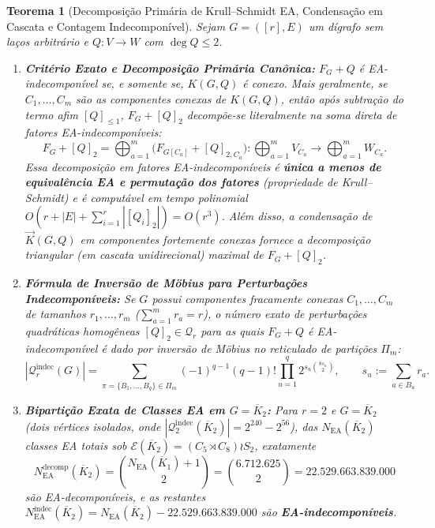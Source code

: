 \documentclass[11pt,a4paper]{article}
\newtheorem{theorem}{Teorema}[section]
\theoremstyle{definition}
\theoremstyle{remark}
\begin{document}
\begin{theorem}[Decomposição Primária de Krull--Schmidt EA, Condensação em Cascata e Contagem Indecomponível]\label{thm:c2_decomposition}
Sejam $G = ([r], E)$ um dígrafo sem laços arbitrário e $Q : V \to W$ com $\deg Q \le 2$.
\begin{enumerate}
  \item \textbf{Critério Exato e Decomposição Primária Canônica:} $F_G + Q$ é EA-indecomponível se, e somente se, $K(G,Q)$ é conexo. Mais geralmente, se $C_1,\dots,C_m$ são as componentes conexas de $K(G,Q)$, então após subtração do termo afim $[Q]_{\le 1}$, $F_G + [Q]_2$ decompõe-se literalmente na soma direta de fatores EA-indecomponíveis:
  \begin{equation}\label{eq:krull_schmidt}
    F_G + [Q]_2 = \bigoplus_{a=1}^m \Big( F_{G[C_a]} + [Q]_{2, C_a} \Big) : \bigoplus_{a=1}^m V_{C_a} \longrightarrow \bigoplus_{a=1}^m W_{C_a}.
  \end{equation}
  Essa decomposição em fatores EA-indecomponíveis é \textbf{única a menos de equivalência EA e permutação dos fatores} (propriedade de Krull--Schmidt) e é computável em tempo polinomial $O(r + |E| + \sum_{i=1}^r |[Q_i]_2|) = O(r^3)$. Além disso, a condensação de $\vec{K}(G,Q)$ em componentes fortemente conexas fornece a decomposição triangular (em cascata unidirecional) maximal de $F_G + [Q]_2$.
  \item \textbf{Fórmula de Inversão de Möbius para Perturbações Indecomponíveis:} Se $G$ possui componentes fracamente conexas $C_1,\dots,C_m$ de tamanhos $r_1,\dots,r_m$ ($\sum_{a=1}^m r_a = r$), o número exato de perturbações quadráticas homogêneas $[Q]_2 \in \mathcal{Q}_r$ para as quais $F_G + Q$ é EA-indecomponível é dado por inversão de Möbius no reticulado de partições $\Pi_m$:
  \begin{equation}\label{eq:mobius_indec_Q}
    |\mathcal{Q}_r^{\mathrm{indec}}(G)| = \sum_{\pi = \{B_1,\dots,B_q\} \in \Pi_m} (-1)^{q-1} (q-1)! \prod_{u=1}^q 2^{s_u \binom{8s_u}{2}}, \qquad s_u := \sum_{a \in B_u} r_a.
  \end{equation}
  \item \textbf{Bipartição Exata de Classes EA em $G = \overline{K}_2$:} Para $r=2$ e $G = \overline{K}_2$ (dois vértices isolados, onde $|\mathcal{Q}_2^{\mathrm{indec}}(\overline{K}_2)| = 2^{240} - 2^{56}$), das $N_{\mathrm{EA}}(\overline{K}_2)$ classes EA totais sob $\mathcal{E}(\overline{K}_2) = (C_5 \rtimes C_8) \wr S_2$, exatamente
  \[
    N_{\mathrm{EA}}^{\mathrm{decomp}}(\overline{K}_2) = \binom{N_{\mathrm{EA}}(\overline{K}_1) + 1}{2} = \binom{6.712.625}{2} = 22.529.663.839.000
  \]
  são EA-decomponíveis, e as restantes $N_{\mathrm{EA}}^{\mathrm{indec}}(\overline{K}_2) = N_{\mathrm{EA}}(\overline{K}_2) - 22.529.663.839.000$ são \textbf{EA-indecomponíveis}.
\end{enumerate}
\end{theorem}
\end{document}
